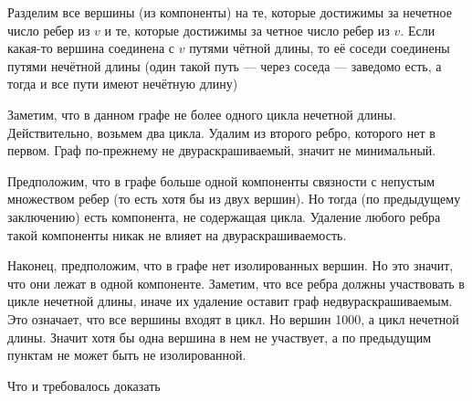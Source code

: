 \documentclass[12pt]{article}
\begin{document}
	Разделим все вершины (из компоненты) на те, которые достижимы за нечетное число ребер из $v$ и те,
	которые достижимы за четное число ребер из $v$. 
	Если какая-то вершина соединена с $v$ путями чётной длины, 
	то её соседи соединены путями нечётной длины 
	(один такой	путь — через соседа — заведомо есть, а тогда и все пути имеют нечётную длину)
	
	
	Заметим, что в данном графе не более одного цикла нечетной длины. 
	Действительно, возьмем два цикла. Удалим из второго ребро, которого нет в первом.
	Граф по-прежнему не двураскрашиваемый, значит не минимальный.
	
	Предположим, что в графе больше одной компоненты связности с непустым множеством ребер 
	(то есть хотя бы из двух вершин). Но тогда (по предыдущему заключению)
	есть компонента, не содержащая цикла. Удаление любого ребра такой компоненты
	никак не влияет на двураскрашиваемость.
	
	Наконец, предположим, что в графе нет изолированных вершин. 
	Но это значит, что они лежат в одной компоненте.
	Заметим, что все ребра должны участвовать в цикле нечетной длины, иначе их удаление 
	оставит граф недвураскрашиваемым. Это означает, что все вершины входят в цикл.
	Но вершин 1000, а цикл нечетной длины. Значит хотя бы одна вершина в нем не участвует, 
	а по предыдущим пунктам не может быть не изолированной.
	
	Что и требовалось доказать
	
\end{document}
